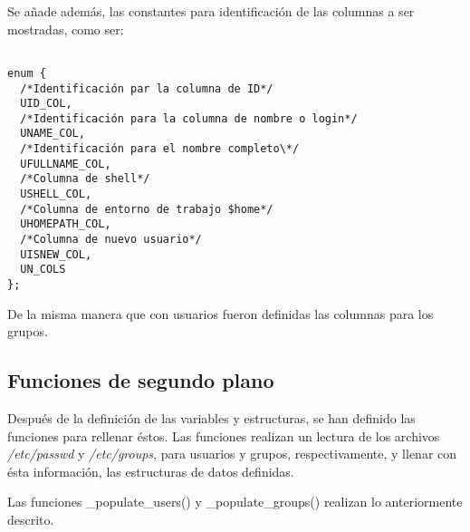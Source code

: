 \documentclass[letterpaper,10pt]{article}
\begin{document}
Se añade además, las constantes para identificación de las columnas a ser mostradas, como ser:
\begin{verbatim}

enum {
  /*Identificación par la columna de ID*/
  UID_COL,
  /*Identificación para la columna de nombre o login*/
  UNAME_COL,
  /*Identificación para el nombre completo\*/
  UFULLNAME_COL,
  /*Columna de shell*/
  USHELL_COL,
  /*Columna de entorno de trabajo $home*/
  UHOMEPATH_COL,
  /*Columna de nuevo usuario*/
  UISNEW_COL,
  UN_COLS
};

\end{verbatim}

De la misma manera que con usuarios fueron definidas las columnas para los grupos.



\subsection{Funciones de segundo plano}
Después de la definición de las variables y estructuras, se han definido las funciones 
para rellenar éstos.
Las funciones realizan un lectura de los archivos \emph{/etc/passwd} y \emph{/etc/groups},
para usuarios y grupos, respectivamente, y llenar con ésta información, las estructuras
de datos definidas.

Las funciones \_populate\_users() y \_populate\_groups() realizan lo anteriormente descrito.
\end{document}
